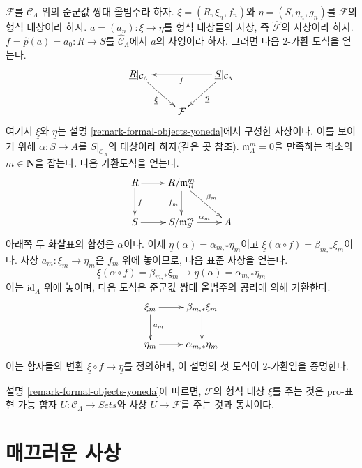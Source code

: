 \begin{remark}
\label{remark-formal-objects-yoneda-map}
$\mathcal{F}$를 $\mathcal{C}_\Lambda$ 위의 준군값 쌍대
올범주라 하자. $\xi = (R, \xi_n, f_n)$와
$\eta = (S, \eta_n, g_n)$를 $\mathcal{F}$의 형식 대상이라 하자.
$a = (a_n) : \xi \to \eta$를 형식 대상들의 사상, 즉
$\widehat{\mathcal{F}}$의 사상이라 하자.
$f = \widehat{p}(a) = a_0 : R \to S$를
$\widehat{\mathcal{C}}_\Lambda$에서 $a$의 사영이라 하자. 그러면 다음
$2$-가환 도식을 얻는다.
$$
\xymatrix{
\underline{R}|_{\mathcal{C}_\Lambda} \ar[rd]_{\underline{\xi}} & &
\underline{S}|_{\mathcal{C}_\Lambda} \ar[ll]^f \ar[ld]^{\underline{\eta}} \\
& \mathcal{F}
}
$$
여기서 $\underline{\xi}$와 $\underline{\eta}$는 설명
\ref{remark-formal-objects-yoneda}에서 구성한 사상이다. 이를 보이기 위해
$\alpha : S \to A$를
$\underline{S}|_{\mathcal{C}_\Lambda}$의 대상이라 하자(같은 곳 참조).
$\mathfrak m_A^m = 0$을 만족하는 최소의 $m \in \mathbf{N}$을 잡는다.
다음 가환도식을 얻는다.
$$
\xymatrix{
R \ar[d]^f \ar[r] & R/\mathfrak m_R^m \ar[d]_{f_m} \ar[rd]^{\beta_m} \\
S \ar[r] & S/\mathfrak m_S^m \ar[r]^{\alpha_m} & A
}
$$
아래쪽 두 화살표의 합성은 $\alpha$이다. 이제
$\underline{\eta}(\alpha) = \alpha_{m, *}\eta_m$이고
$\underline{\xi}(\alpha \circ f) = \beta_{m, *}\xi_m$이다. 사상
$a_m : \xi_m \to \eta_m$은 $f_m$ 위에 놓이므로, 다음 표준 사상을
얻는다.
$$
\underline{\xi}(\alpha \circ f) = \beta_{m, *}\xi_m
\longrightarrow
\underline{\eta}(\alpha) = \alpha_{m, *}\eta_m
$$
이는 $\text{id}_A$ 위에 놓이며, 다음 도식은 준군값 쌍대 올범주의
공리에 의해 가환한다.
$$
\xymatrix{
\xi_m \ar[r] \ar[d]^{a_m} &  \beta_{m, *}\xi_m \ar[d] \\
\eta_m \ar[r] &  \alpha_{m, *}\eta_m
}
$$
이는 함자들의 변환 $\underline{\xi} \circ f \to \underline{\eta}$를
정의하며, 이 설명의 첫 도식이 2-가환임을 증명한다.
\end{remark}

\begin{remark}
\label{remark-spell-out-formal-object}
설명 \ref{remark-formal-objects-yoneda}에 따르면,
$\mathcal{F}$의 형식 대상 $\xi$를 주는 것은 pro-표현 가능 함자
$U : \mathcal{C}_\Lambda \to \textit{Sets}$와 사상
$U \to \mathcal{F}$를 주는 것과 동치이다.
\end{remark}

\section{매끄러운 사상}
\label{section-smooth-morphisms}

